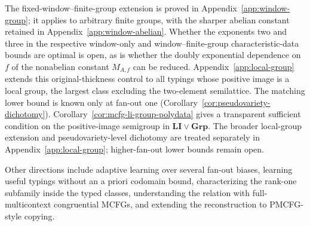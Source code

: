 The fixed-window--finite-group extension is proved in
Appendix~\ref{app:window-group}; it applies to arbitrary
finite groups, with the sharper abelian constant retained
in Appendix~\ref{app:window-abelian}.
Whether the exponents two and three in the respective
window-only and window--finite-group characteristic-data bounds
are optimal is open, as is whether the doubly exponential
dependence on $f$ of the nonabelian constant $M_{A,f}$ can be reduced.
Appendix~\ref{app:local-group} extends this original-thickness
control to all typings whose positive image is a local group, the
largest class excluding the two-element semilattice.  The matching
lower bound is known only at fan-out one
(Corollary~\ref{cor:pseudovariety-dichotomy}).
Corollary~\ref{cor:mcfg-li-group-polydata} gives a
transparent sufficient condition on the positive-image semigroup in
$\mathbf{LI}\vee\mathbf{Grp}$.  The broader local-group extension and
pseudovariety-level dichotomy are treated separately in
Appendix~\ref{app:local-group}; higher-fan-out lower bounds remain open.

Other directions include adaptive learning over several fan-out biases,
learning useful typings without an a priori codomain bound, characterizing the
rank-one subfamily inside the typed classes, understanding the relation with
full-multicontext congruential MCFGs, and extending the reconstruction to
PMCFG-style copying.

